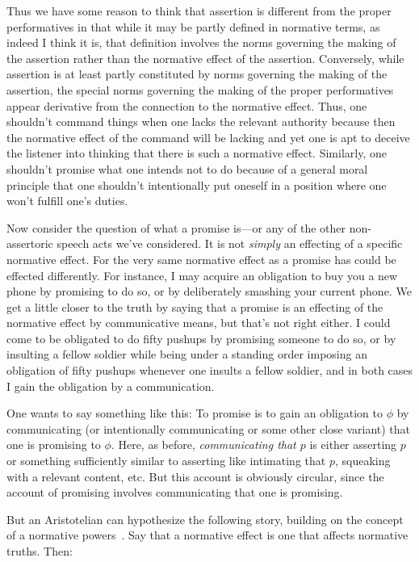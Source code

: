 Thus we have some reason to think that assertion is different from the proper performatives in that while 
it may be partly defined in normative terms, as indeed I think it is, that definition 
involves the norms governing the making of the assertion rather than the normative effect of the assertion.
Conversely, while assertion is at least partly constituted by norms governing the making of the assertion,
the special norms governing the making of the proper performatives appear derivative from the connection
to the normative effect. Thus, one shouldn't command things when one lacks the relevant authority because 
then the normative effect of the command will be lacking and yet one is apt to deceive the listener into
thinking that there is such a normative effect. Similarly, one shouldn't promise what one intends not to
do because of a general moral principle that one shouldn't intentionally put oneself in a position where 
one won't fulfill one's duties. 

Now consider the question of what a promise is---or any of the other non-assertoric speech acts we've
considered. It is not \textit{simply} an effecting of a specific normative effect. For the very same
normative effect as a promise has could be effected differently. For instance, I may acquire an obligation
to buy you a new phone by promising to do so, or by deliberately smashing your current phone. We get a 
little closer to the truth by saying that a promise is an effecting of the normative effect by communicative
means, but that's not right either. I could come to be obligated to do fifty pushups by promising someone to do so,
or by insulting a fellow soldier while being under a standing order imposing an obligation of fifty pushups whenever 
one insults a fellow soldier, and in both cases I gain the obligation by a communication.

One wants to say something like this: To promise is to gain an obligation to 
$\phi$ by communicating (or intentionally communicating or some other close variant) that one is promising 
to $\phi$. Here, as before, \textit{communicating that $p$} is either asserting $p$ or something sufficiently similar 
to asserting like intimating that $p$, squeaking with a relevant content, etc. But this account is obviously circular, since the account of promising
involves communicating that one is promising.

But an Aristotelian can hypothesize the following story, building on the concept of a normative powers~\parencite{Raz1972,
Lewinsohn2024, DurhamDissertation}.
Say that a normative effect is one that affects normative truths.
Then:


